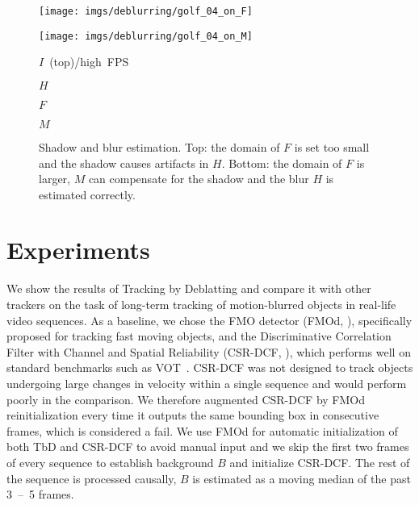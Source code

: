 \documentclass[10pt,twocolumn,letterpaper]{article}
\begin{document}
\begin{figure}
\begin{minipage}[t]{.24\linewidth}
		\centering
		\texttt{[image: imgs/deblurring/golf\_04\_on\_F]}
	\end{minipage}\hfill \begin{minipage}[t]{.24\linewidth}
		\centering
		\texttt{[image: imgs/deblurring/golf\_04\_on\_M]}
	\end{minipage}
\begin{minipage}[t]{.24\linewidth}
		\centering\scriptsize
		\mbox{$I$ (top)/high FPS}
	\end{minipage}\hfill \begin{minipage}[t]{.24\linewidth}
		\centering
		$H$
	\end{minipage}\hfill \begin{minipage}[t]{.24\linewidth}
		\centering
		$F$
	\end{minipage}\hfill \begin{minipage}[t]{.24\linewidth}
		\centering
		$M$
	\end{minipage}\caption{Shadow and blur estimation. Top: the domain of $F$ is set too small and the shadow causes artifacts in $H$. Bottom: the domain of $F$ is larger, $M$ can compensate for the shadow and the blur $H$ is estimated correctly.}
	\label{fig:deblurring_shadow}
\end{figure} 
\section{Experiments}
\label{sec:experiments}
We show the results of Tracking by Deblatting and compare it with other trackers on the task of long-term tracking of motion-blurred objects in real-life video sequences. As a baseline, we chose the FMO detector (FMOd, \cite{fmo}), specifically proposed for tracking fast moving objects, and the Discriminative Correlation Filter with Channel and Spatial Reliability (CSR-DCF, \cite{csrdcf}), which performs well on standard benchmarks such as VOT~\cite{vot2016}. CSR-DCF was not designed to track objects undergoing large changes in velocity within a single sequence and would perform poorly in the comparison. We therefore augmented CSR-DCF by FMOd reinitialization every time it outputs the same bounding box in consecutive frames, which is considered a fail. We use FMOd for automatic initialization of both TbD and CSR-DCF to avoid manual input and we skip the first two frames of every sequence to establish background $B$ and initialize CSR-DCF. The rest of the sequence is processed causally, $B$ is estimated as a moving median of the  past 3~--~5 frames.
\end{document}
